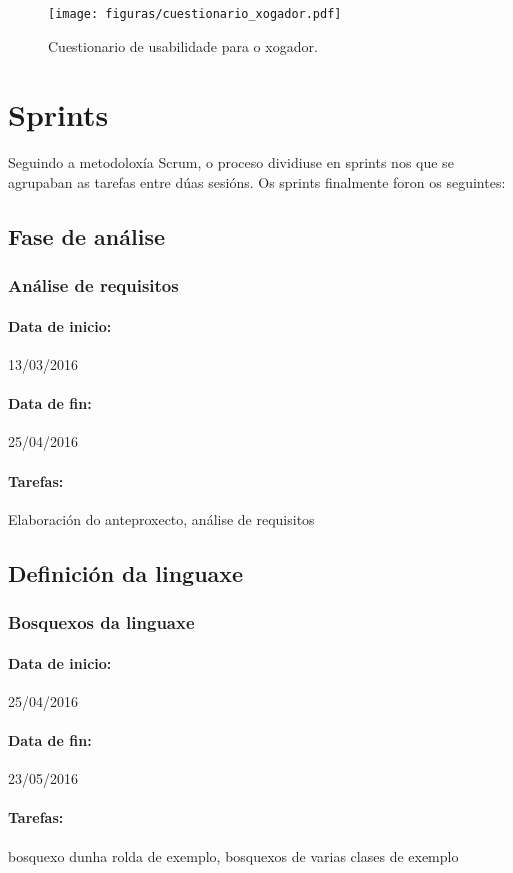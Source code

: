 \begin{figure}
\centerline{\texttt{[image: figuras/cuestionario\_xogador.pdf]}}
\caption{Cuestionario de usabilidade para o xogador.}
\label{fig:cuestion-xog}
\end{figure}


\section{Sprints}
Seguindo a metodoloxía Scrum, o proceso dividiuse en sprints nos que se
agrupaban as tarefas entre dúas sesións. Os sprints finalmente foron os
seguintes:
\subsection{Fase de análise}
\subsubsection{Análise de requisitos}
\paragraph{Data de inicio:} 13/03/2016
\paragraph{Data de fin:} 25/04/2016
\paragraph{Tarefas:} Elaboración do anteproxecto, análise de requisitos


\subsection{Definición da linguaxe}
\subsubsection{Bosquexos da linguaxe}
\paragraph{Data de inicio:} 25/04/2016
\paragraph{Data de fin:} 23/05/2016
\paragraph{Tarefas:} bosquexo dunha rolda de exemplo, bosquexos de varias clases
de exemplo

